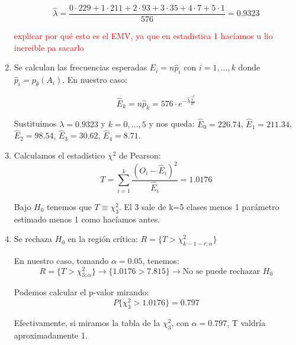 \documentclass[palatino,nochap]{apuntes}
\begin{document}
\begin{example}
\begin{enumerate}
$$ \hat{\lambda} = \frac{0\cdot229 + 1\cdot211+2\cdot93+3\cdot35+4\cdot7+5\cdot1}{576}=0.9323$$

\textcolor{red}{explicar por qué esto es el EMV, ya que en estadistica 1 hacíamos u lio increible pa sacarlo}

\item Se calculan las frecuencias esperadas $\hat{E}_i=n\hat{p}_i$ con $i=1,...,k$ donde $\hat{p}_i = p_{\hat{\theta}}(A_i)$. En nuestro caso:

$$\hat{E}_k = n\hat{p}_k = 576\cdot e^{-\hat{\lambda}\frac{\hat{\lambda}^k}{k!}}$$

Sustituimos $\lambda = 0.9323$ y $k=0,...,5$ y nos queda: $\hat{E}_0 = 226.74 $, $\hat{E}_1 = 211.34 $, $\hat{E}_2 = 98.54$, $\hat{E}_3 = 30.62$, $\hat{E}_4 = 8.71$.

\item Calculamos el estadístico $\chi^2$ de Pearson:
\[
T=\sum_{i=1}^k \frac{(O_i-\hat{E}_i)^2}{\hat{E}_i} = 1.0176
\]

Bajo $H_0$ tenemos que $T \equiv \chi^2_3$. El 3 sale de k=5 clases menos 1 parámetro estimado menos 1 como hacíamos antes.

\item Se rechaza $H_0$ en la región crítica: $R=\{T>\chi^2_{k-1-r;\alpha}  \}$

En nuestro caso, tomando $\alpha = 0.05$, tenemos: $$R=\{T>\chi^2_{3;\alpha} \} \rightarrow \{1.0176>7.815 \} \rightarrow \text{No se puede rechazar } H_0$$

Podemos calcular el p-valor mirando:
$$P\{\chi^2_3 > 1.0176\} = 0.797$$

Efectivamente, si miramos la tabla de la $\chi^2_3$, con $\alpha =0.797$, T valdría aproximadamente 1.
\end{enumerate}

\end{example}
\end{document}
